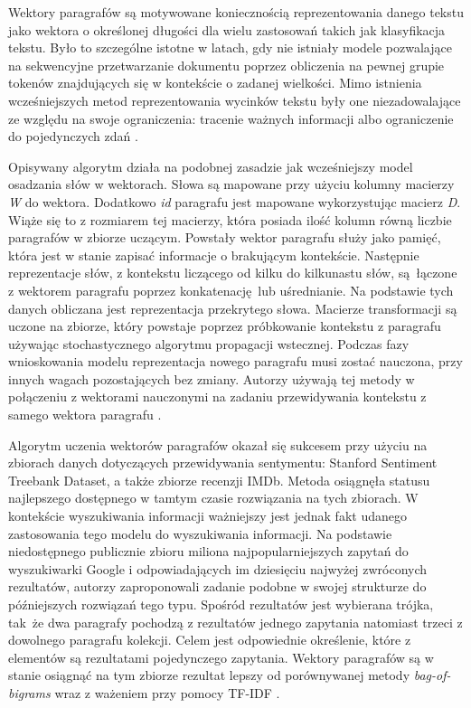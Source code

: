Wektory paragrafów są motywowane koniecznością reprezentowania danego tekstu jako wektora o określonej długości dla wielu zastosowań takich jak klasyfikacja tekstu. Było to szczególne istotne w latach, gdy nie istniały modele pozwalające na sekwencyjne przetwarzanie dokumentu poprzez obliczenia na pewnej grupie tokenów znajdujących się w kontekście o zadanej wielkości. Mimo istnienia wcześniejszych metod reprezentowania wycinków tekstu były one niezadowalające ze względu na swoje ograniczenia: tracenie ważnych informacji albo ograniczenie do pojedynczych zdań \autocite{le2014distributed}.\newline

Opisywany algorytm działa na podobnej zasadzie jak wcześniejszy model osadzania słów w wektorach. Słowa są mapowane przy użyciu kolumny macierzy \emph{W} do wektora. Dodatkowo \emph{id} paragrafu jest mapowane wykorzystując macierz \emph{D}. Wiąże się to z rozmiarem tej macierzy, która posiada ilość kolumn równą liczbie paragrafów w zbiorze uczącym. Powstały wektor paragrafu służy jako pamięć, która jest w stanie zapisać informacje o brakującym kontekście. Następnie reprezentacje słów, z kontekstu liczącego od kilku do kilkunastu słów, są łączone z wektorem paragrafu poprzez konkatenację lub uśrednianie. Na podstawie tych danych obliczana jest reprezentacja przekrytego słowa. Macierze transformacji są uczone na zbiorze, który powstaje poprzez próbkowanie kontekstu z paragrafu używając stochastycznego algorytmu propagacji wstecznej. Podczas fazy wnioskowania modelu reprezentacja nowego paragrafu musi zostać nauczona, przy innych wagach pozostających bez zmiany. Autorzy używają tej metody w połączeniu z wektorami nauczonymi na zadaniu przewidywania kontekstu z samego wektora paragrafu \autocite{le2014distributed}.\newline

Algorytm uczenia wektorów paragrafów okazał się sukcesem przy użyciu na zbiorach danych dotyczących przewidywania sentymentu: Stanford Sentiment Treebank Dataset, a także zbiorze recenzji IMDb. Metoda osiągnęła statusu najlepszego dostępnego w tamtym czasie rozwiązania na tych zbiorach. W kontekście wyszukiwania informacji ważniejszy jest jednak fakt udanego zastosowania tego modelu do wyszukiwania informacji. Na podstawie niedostępnego publicznie zbioru miliona najpopularniejszych zapytań do wyszukiwarki Google i odpowiadających im dziesięciu najwyżej zwróconych rezultatów, autorzy zaproponowali zadanie podobne w swojej strukturze do późniejszych rozwiązań tego typu. Spośród rezultatów jest wybierana trójka, tak że dwa paragrafy pochodzą z rezultatów jednego zapytania natomiast trzeci z dowolnego paragrafu kolekcji. Celem jest odpowiednie określenie, które z elementów są rezultatami pojedynczego zapytania. Wektory paragrafów są w stanie osiągnąć na tym zbiorze rezultat lepszy od porównywanej metody \emph{bag-of-bigrams} wraz z ważeniem przy pomocy TF-IDF \autocite{le2014distributed}.\newline  


